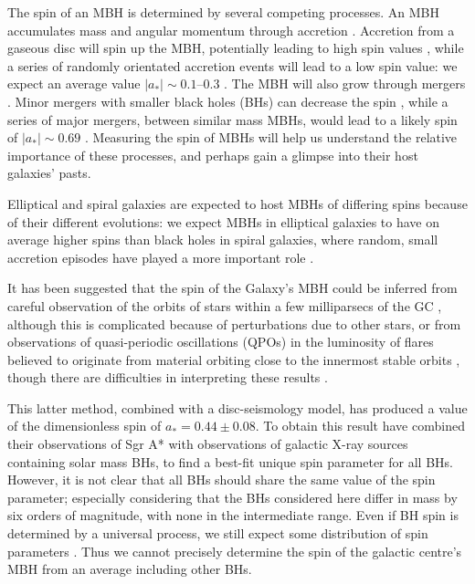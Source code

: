 \documentclass[useAMS,usedcolumn,usegraphicx,usenatbib]{mn2e}
\begin{document}
The spin of an MBH is determined by several competing processes. An MBH accumulates mass and angular momentum through accretion \citep{Volonteri2010}. Accretion from a gaseous disc will spin up the MBH, potentially leading to high spin values \citep{Volonteri2005}, while a series of randomly orientated accretion events will lead to a low spin value: we expect an average value $|a_\ast| \sim 0.1$--$0.3$ \citep*{King2006, King2008}. The MBH will also grow through mergers \citep{Yu2002, Malbon2007}. Minor mergers with smaller black holes (BHs) can decrease the spin \citep*{Hughes2003, Gammie2004}, while a series of major mergers, between similar mass MBHs, would lead to a likely spin of $|a_\ast| \sim 0.69$ \citep{Berti2008, Berti2007, Gonzalez2007}. Measuring the spin of MBHs will help us understand the relative importance of these processes, and perhaps gain a glimpse into their host galaxies' pasts.

Elliptical and spiral galaxies are expected to host MBHs of differing spins because of their different evolutions: we expect MBHs in elliptical galaxies to have on average higher spins than black holes in spiral galaxies, where random, small accretion episodes have played a more important role \citep*{Volonteri2007, Sikora2007}.

It has been suggested that the spin of the Galaxy's MBH could be inferred from careful observation of the orbits of stars within a few milliparsecs of the GC \citep{Merritt2010}, although this is complicated because of perturbations due to other stars, or from observations of quasi-periodic oscillations (QPOs) in the luminosity of flares believed to originate from material orbiting close to the innermost stable orbits \citep{Genzel2003a, Belanger2006, Trippe2007, Hamaus2009, Kato2010}, though there are difficulties in interpreting these results \citep{Psaltis2008a}.

This latter method, combined with a disc-seismology model, has produced a value of the dimensionless spin of $a_\ast = 0.44 \pm 0.08$. To obtain this result \citet{Kato2010} have combined their observations of Sgr A* with observations of galactic X-ray sources containing solar mass BHs, to find a best-fit unique spin parameter for all BHs. However, it is not clear that all BHs should share the same value of the spin parameter; especially considering that the BHs considered here differ in mass by six orders of magnitude, with none in the intermediate range. Even if BH spin is determined by a universal process, we still expect some distribution of spin parameters \citep{King2008, Berti2008}. Thus we cannot precisely determine the spin of the galactic centre's MBH from an average including other BHs.
\end{document}
